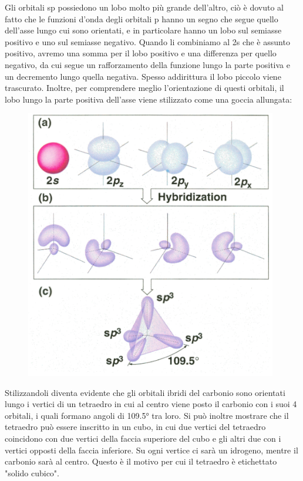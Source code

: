 Gli orbitali sp possiedono un lobo molto più grande dell'altro, ciò è dovuto al fatto che le funzioni d'onda degli orbitali p hanno un segno che segue quello dell'asse lungo cui sono orientati, e in particolare hanno un lobo sul semiasse positivo e uno sul semiasse negativo. Quando li combiniamo al 2s che è assunto positivo, avremo una somma per il lobo positivo e una differenza per quello negativo, da cui segue un rafforzamento della funzione lungo la parte positiva e un decremento lungo quella negativa. Spesso addirittura il lobo piccolo viene trascurato. Inoltre, per comprendere meglio l'orientazione di questi orbitali, il lobo lungo la parte positiva dell'asse viene stilizzato come una goccia allungata:

\begin{figure}[htp]
    \centering
    \includegraphics[width=11cm]{immagini/orbitali-sp3.png}
\end{figure}
Stilizzandoli diventa evidente che gli orbitali ibridi del carbonio sono orientati lungo i vertici di un tetraedro in cui al centro viene posto il carbonio con i suoi 4 orbitali, i quali formano angoli di 109.5° tra loro. Si può inoltre mostrare che il tetraedro può essere inscritto in un cubo, in cui due vertici del tetraedro coincidono con due vertici della faccia superiore del cubo e gli altri due con i vertici opposti della faccia inferiore. Su ogni vertice ci sarà un idrogeno, mentre il carbonio sarà al centro. Questo è il motivo per cui il tetraedro è etichettato "solido cubico".

